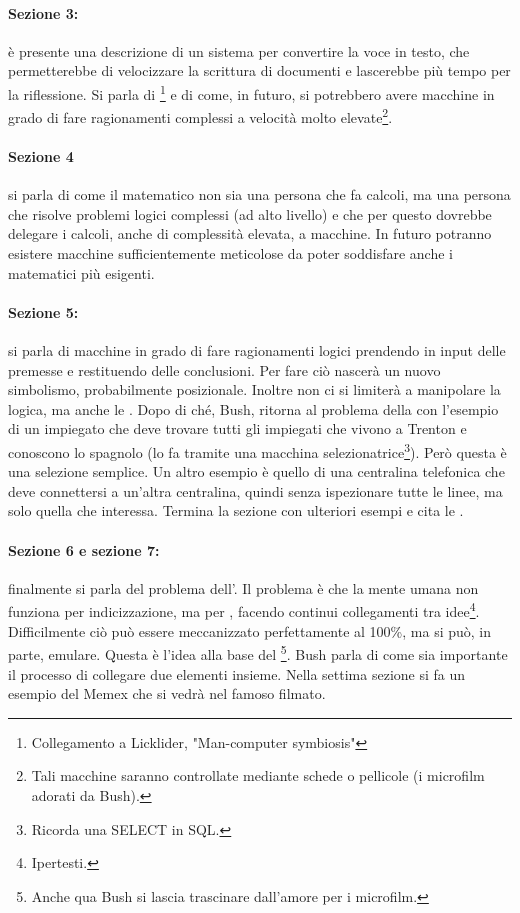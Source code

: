 \paragraph{Sezione 3:} è presente una descrizione di un sistema per convertire la voce in testo, che permetterebbe
di velocizzare la scrittura di documenti e lascerebbe più tempo per la riflessione. Si parla di \footnote{Collegamento a Licklider, "Man-computer symbiosis"} e di come, in futuro,
si potrebbero avere macchine in grado di fare ragionamenti complessi a velocità molto elevate\footnote{
    Tali macchine saranno controllate mediante schede o pellicole (i microfilm adorati da Bush).
}.

\paragraph{Sezione 4} si parla di come il matematico non sia una persona che fa calcoli, ma una persona che risolve problemi
logici complessi (ad alto livello) e che per questo dovrebbe delegare i calcoli, anche di complessità elevata, a macchine. 
In futuro potranno esistere macchine sufficientemente meticolose da poter soddisfare
anche i matematici più esigenti.

\paragraph{Sezione 5:} si parla di macchine in grado di fare ragionamenti logici prendendo in input delle premesse e restituendo
delle conclusioni. Per fare ciò nascerà un nuovo simbolismo, probabilmente posizionale. Inoltre non ci si limiterà a manipolare la logica,
ma anche le . Dopo di ché, Bush, ritorna al problema della  con l'esempio di 
un impiegato che deve trovare tutti gli impiegati che vivono a Trenton e conoscono lo spagnolo (lo fa tramite una macchina selezionatrice\footnote{
    Ricorda una SELECT in SQL.
}).
Però questa è una selezione semplice. Un altro esempio è quello di una centralina telefonica che deve connettersi a un'altra 
centralina, quindi senza ispezionare tutte le linee, ma solo quella che interessa. Termina
la sezione con ulteriori esempi e cita le .

\paragraph{Sezione 6 e sezione 7:} finalmente si parla del problema dell'. Il problema è che la mente umana 
non funziona per indicizzazione, ma per , facendo continui collegamenti tra idee\footnote{Ipertesti.}.
Difficilmente ciò può essere meccanizzato perfettamente al 100\%, ma si può, in parte, emulare. Questa 
è l'idea alla base del \footnote{Anche qua Bush si lascia trascinare dall'amore per i microfilm.}.
Bush parla di come sia importante il processo di collegare due elementi insieme. Nella 
settima sezione si fa un esempio del Memex che si vedrà nel famoso filmato.

